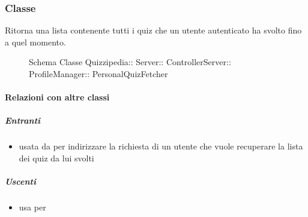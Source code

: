 \subsubsection{Classe }
Ritorna una lista contenente tutti i quiz che un utente autenticato ha svolto fino a quel momento.
\begin{figure}[H]
\centering
\noindent{}
\caption[Schema Classe PersonalQuizFetcher]{Schema Classe Quizzipedia:: Server:: ControllerServer:: ProfileManager:: PersonalQuizFetcher}
\end{figure}
\paragraph{Relazioni con altre classi}
\subparagraph{Entranti}
\begin{itemize}
\item usata da  per indirizzare la richiesta di un utente che vuole recuperare la lista dei quiz da lui svolti
\end{itemize}
\subparagraph{Uscenti}
\begin{itemize}
\item usa  per 
\end{itemize}
